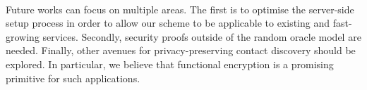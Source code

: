 \paragraph{} Future works can focus on multiple areas. The first is to optimise the server-side setup process in order to allow our scheme to be applicable to existing and fast-growing services. Secondly, security proofs outside of the random oracle model are needed. Finally, other avenues for privacy-preserving contact discovery should be explored. In particular, we believe that functional encryption \cite{Boneh2010} is a promising primitive for such applications.